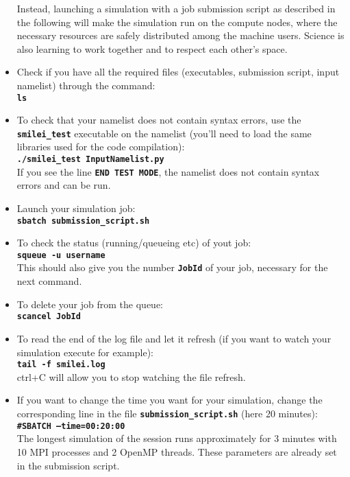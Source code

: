\documentclass{article}
\newcommand{\commandline}[1]{\texttt{\textbf{#1}}}
\begin{document}
\begin{itemize}
Instead, launching a simulation with a job submission script as described in the following will make the simulation run on the compute nodes, where the necessary resources are safely distributed among the machine users.  Science is also learning to work together and to respect each other's space.\\

\item Check if you have all the required files (executables, submission script, input namelist) through the command:\\
\commandline{ls}

\item To check that your namelist does not contain syntax errors, use the \commandline{smilei\_test} executable on the namelist (you'll need to load the same libraries used for the code compilation):\\
\commandline{./smilei\_test InputNamelist.py}\\
If you see the line \commandline{END TEST MODE}, the namelist does not contain syntax errors and can be run.

\item Launch your simulation job:\\
\commandline{sbatch submission\_script.sh}

\item To check the status (running/queueing etc) of yout job:\\
\commandline{squeue -u username}\\
This should also give you the number \commandline{JobId} of your job, necessary for the next command.

\item To delete your job from the queue:\\
\commandline{scancel JobId}

\item To read the end of the log file and let it refresh (if you want to watch your simulation execute for example):\\
\commandline{tail -f smilei.log}\\
ctrl+C will allow you to stop watching the file refresh.

\item If you want to change the time you want for your simulation, change the corresponding line in the file \commandline{submission\_script.sh} (here 20 minutes):\\
\commandline{\#SBATCH --time=00:20:00}\\
The longest simulation of the session runs approximately for 3 minutes with 10 MPI processes and 2 OpenMP threads. These parameters are already set in the submission script.


\end{itemize}
\end{document}

